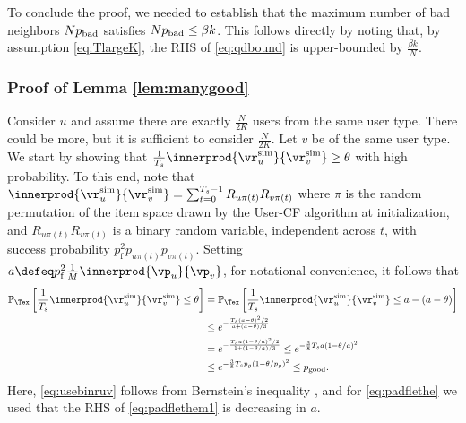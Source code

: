 \documentclass{article}
\newcommand\pf{p_{\mathrm{f}}}
\newcommand{\vratingS}{\vocrating^{\text{sim}}}
\newcommand\vocrating{\vr}
\newcommand\ocR{R}
\renewcommand\PR[2][\Tex]{
\ifthenelse{\equal{#1}{}}{{\mathbb P}\left[#2\right]}{\ensuremath{{\mathbb P}_{#1}\left[ #2\right]}}}
\begin{document}
To conclude the proof, we needed to establish that the maximum number of bad neighbors $N  p_{\mathrm{bad}}$ satisfies $N p_{\mathrm{bad}} \leq \beta k$. This follows directly by noting that, by assumption \eqref{eq:TlargeK}, the RHS of \eqref{eq:qdbound} is upper-bounded by $\frac{\beta k}{N}$. 


\subsubsection{Proof of Lemma \ref{lem:manygood}}

Consider $u$ and assume there are exactly $\frac{N}{2K}$ users from the same user type. There could be more, but it is sufficient to consider $\frac{N}{2K}$. 
Let $v$ be of the same user type. 
We start by showing that $\frac{1}{T_s}\innerprod{\vratingS_u }{\vratingS_v} \geq \theta$ with high probability. 
To this end, note that $\innerprod{\vratingS_u }{\vratingS_v}
= \sum_{t=0}^{T_s-1} 
\ocR_{u \pi(t)} \ocR_{v \pi(t)}
$ where $\pi$ is the random permutation of the item space 
drawn by the User-CF algorithm at initialization, 
and $\ocR_{u \pi(t)} \ocR_{v \pi(t)}$ is a binary random variable, independent across $t$, with success probability $\pf^2 p_{u \pi(t)} p_{v \pi(t)}$. 
Setting $a \defeq \pf^2 \frac{1}{M} \innerprod{\vp_u}{\vp_v}$, for notational convenience, 
it follows that 
\begin{align}
\PR{ \frac{1}{T_s} \innerprod{\vratingS_u }{\vratingS_v}  
\leq \theta }
%
&=
\PR{ \frac{1}{T_s} \innerprod{\vratingS_u }{\vratingS_v}  \leq a  - (a - \theta)} \\
%
&\leq 
e^{ - 
\frac{T_s (a - \theta)^2 /2}{ a + (a - \theta)/3 } 
}  \label{eq:usebinruv} \\
&=
e^{ - 
\frac{T_s a(1 - \theta/a)^2 /2}{ 1 + (1 - \theta/a)/3 } 
}
%
\leq e^{  - \frac{3}{ 8 } T_s a  ( 1 - \theta/ a  )^2}  \label{eq:padflethem1} \\
%
&\leq e^{  - \frac{3}{ 8 } T_s  p_g  ( 1 - \theta/ p_g  )^2 } \leq \perrg. 
\label{eq:padflethe}
\end{align}
Here, \eqref{eq:usebinruv} follows from Bernstein's inequality \cite{bardenet_concentration_2015}, and for \eqref{eq:padflethe} we used that the RHS of \eqref{eq:padflethem1} is decreasing in $a$. 
\end{document}
